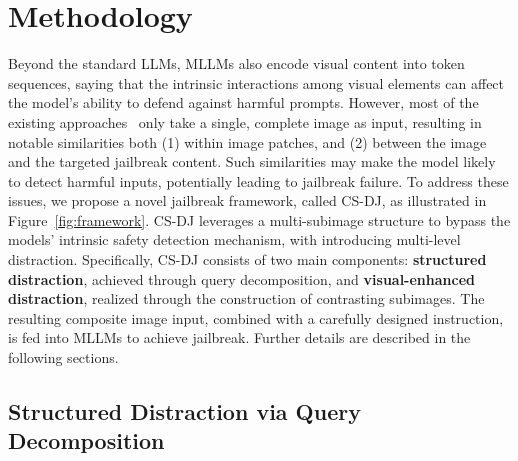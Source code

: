 \section{Methodology}
\label{sec:method}






Beyond the standard LLMs, MLLMs also encode visual content into token sequences, saying that the intrinsic interactions among visual elements can affect the model’s ability to defend against harmful prompts. However, most of the existing approaches~\citep{li2024images, liu2023query, liu2025mm} only take a single, complete image as input, resulting in notable similarities both (1) within image patches, and (2) between the image and the targeted jailbreak content. Such similarities may make the model likely to detect harmful inputs, potentially leading to jailbreak failure. To address these issues, we propose a novel jailbreak framework, called CS-DJ, as illustrated in Figure~\ref{fig:framework}. CS-DJ leverages a multi-subimage structure to bypass the models' intrinsic safety detection mechanism, with introducing multi-level distraction. Specifically, CS-DJ consists of two main components: \textbf{structured distraction}, achieved through query decomposition, and \textbf{visual-enhanced distraction}, realized through the construction of contrasting subimages. The resulting composite image input, combined with a carefully designed instruction, is fed into MLLMs to achieve jailbreak. Further details are described in the following sections.

\subsection{Structured Distraction via Query Decomposition}
\label{subsec:structuredistraction}

